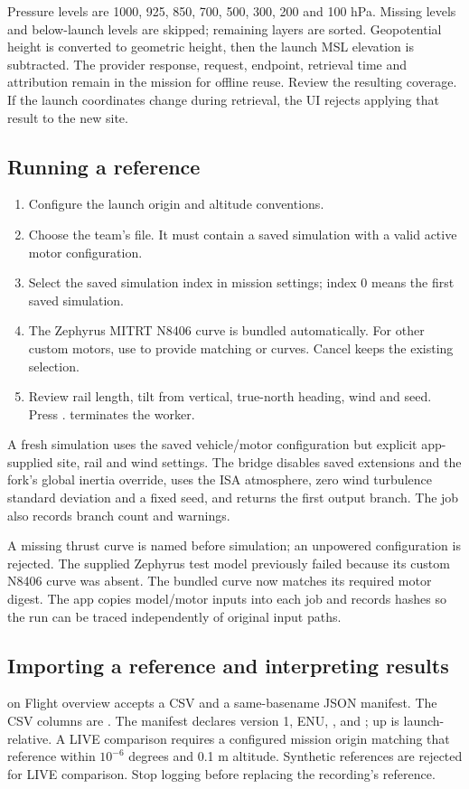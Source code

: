 Pressure levels are 1000, 925, 850, 700, 500, 300, 200 and 100 hPa. Missing levels
and below-launch levels are skipped; remaining layers are sorted.
Geopotential height is converted to geometric height, then the launch MSL
elevation is subtracted. The provider response, request, endpoint, retrieval time
and attribution remain in the mission for offline reuse. Review the resulting
coverage. If the launch coordinates change during retrieval, the UI rejects
applying that result to the new site.

\subsection{Running a reference}
\begin{enumerate}
\item Configure the launch origin and altitude conventions.
\item Choose the team's  file. It must contain a saved simulation with
a valid active motor configuration.
\item Select the saved simulation index in mission settings; index 0 means the
first saved simulation.
\item The Zephyrus MITRT N8406 curve is bundled automatically. For other custom
motors, use  to provide matching  or
 curves. Cancel keeps the existing selection.
\item Review rail length, tilt from vertical, true-north heading, wind and seed.
Press .  terminates the worker.
\end{enumerate}
A fresh simulation uses the saved vehicle/motor configuration but explicit
app-supplied site, rail and wind settings. The bridge disables saved extensions
and the fork's global inertia override, uses the ISA atmosphere, zero wind
turbulence standard deviation and a fixed seed, and returns the first output
branch. The job also records branch count and warnings.

A missing thrust curve is named before simulation; an unpowered configuration
is rejected. The supplied Zephyrus test model previously failed because its
custom N8406 curve was absent. The bundled curve now matches its required motor
digest. The app copies model/motor inputs into each job and records hashes so
the run can be traced independently of original input paths.

\subsection{Importing a reference and interpreting results}
 on Flight overview accepts a CSV and a same-basename JSON
manifest. The CSV columns are .
The manifest declares version 1, ENU, , and
; up is launch-relative.
A LIVE comparison requires a configured mission origin matching that reference
within \(10^{-6}\) degrees and 0.1 m altitude. Synthetic references are rejected
for LIVE comparison. Stop logging before replacing the recording's reference.

